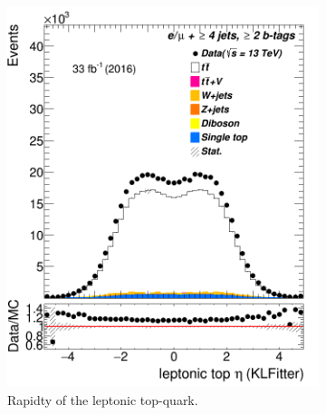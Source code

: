 \begin{figure}
\begin{subfigure}{0.35\textwidth}
		\includegraphics[width=\linewidth]{ControlPlots_emujets_2016_4incl_2incl/klf_topLep_eta_emujets_2016.png}
		\caption{Rapidty of the leptonic top-quark.} \label{fig:25}
	\end{subfigure}
	\hspace*{1.5cm}	
	\begin{subfigure}{0.35\textwidth}

\end{subfigure}
\end{figure}
